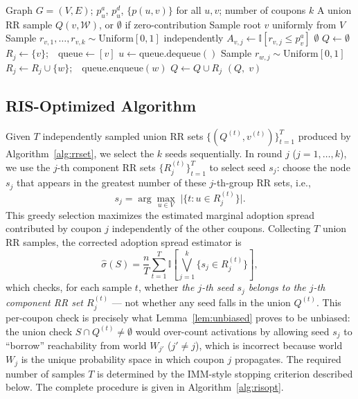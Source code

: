 \documentclass[sigconf]{acmart}
\begin{document}
\begin{algorithm}[t]
\caption{Conditioned Union RR-Set Generation}
\label{alg:rrset}
\begin{algorithmic}[1]
\Require Graph $G=(V,E)$; $p_u^a$, $p_u^d$, $\{p(u,v)\}$ for all $u,v$; number of coupons $k$
\Ensure A union RR sample $Q(v, \mathcal{W})$, or $\emptyset$ if zero-contribution
\State Sample root $v$ uniformly from $V$
\State Sample $r_{v,1}, \ldots, r_{v,k} \sim \mathrm{Uniform}[0,1]$ independently
  \State $A_{v,j} \leftarrow \mathbb{I}[r_{v,j} \leq p_v^a]$
\EndFor
{}
  \State \Return $\emptyset$ 
\EndIf
\State $Q \leftarrow \emptyset$
    \State $R_j \leftarrow \{v\}$;\ \ $\mathrm{queue} \leftarrow [v]$
      \State $u \leftarrow \mathrm{queue.dequeue()}$
          \State Sample $r_{w,j} \sim \mathrm{Uniform}[0,1]$
        \EndIf
          \State $R_j \leftarrow R_j \cup \{w\}$;\ \ $\mathrm{queue.enqueue}(w)$
        \EndIf
      \EndFor
    \EndWhile
    \State $Q \leftarrow Q \cup R_j$
  \EndIf
\EndFor
\State \Return $(Q,\; v)$
\end{algorithmic}
\end{algorithm}

\subsection{RIS-Optimized Algorithm}

Given $T$ independently sampled union RR sets $\{(Q^{(t)}, v^{(t)})\}_{t=1}^{T}$ produced by Algorithm~\ref{alg:rrset}, we select the $k$ seeds sequentially. In round $j$ ($j = 1, \ldots, k$), we use the $j$-th component RR sets $\{R_j^{(t)}\}_{t=1}^{T}$ to select seed $s_j$: choose the node $s_j$ that appears in the greatest number of these $j$-th-group RR sets, i.e.,
\[
  s_j = \arg\max_{u \in V}\; \bigl|\{t : u \in R_j^{(t)}\}\bigr|.
\]
This greedy selection maximizes the estimated marginal adoption spread contributed by coupon $j$ independently of the other coupons. Collecting $T$ union RR samples, the corrected adoption spread estimator is
\[
  \hat{\sigma}(S) = \frac{n}{T}\sum_{t=1}^{T}
    \mathbb{I}\!\left[\bigvee_{j=1}^{k} \bigl\{s_j \in R_j^{(t)}\bigr\}\right],
\]
which checks, for each sample $t$, whether \emph{the $j$-th seed $s_j$ belongs to the $j$-th component RR set $R_j^{(t)}$} — not whether any seed falls in the union $Q^{(t)}$. This per-coupon check is precisely what Lemma~\ref{lem:unbiased} proves to be unbiased: the union check $S \cap Q^{(t)} \neq \emptyset$ would over-count activations by allowing seed $s_j$ to ``borrow'' reachability from world $W_{j'}$ ($j' \neq j$), which is incorrect because world $W_j$ is the unique probability space in which coupon $j$ propagates. The required number of samples $T$ is determined by the IMM-style stopping criterion described below. The complete procedure is given in Algorithm~\ref{alg:risopt}.
\end{document}
